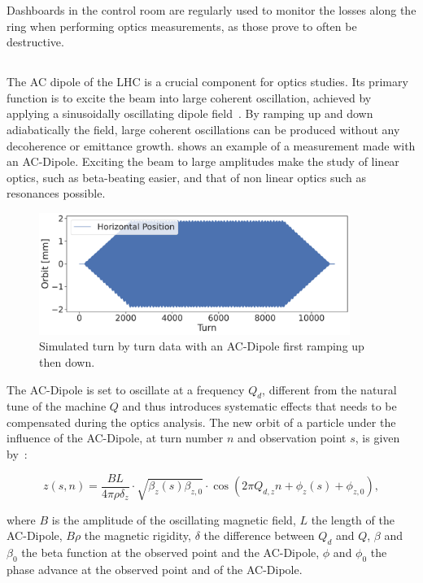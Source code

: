 Dashboards in the control room are regularly used to monitor the losses along the ring when
performing optics measurements, as those prove to often be destructive.

\subsection{}

The AC dipole of the LHC is a crucial component for optics studies. Its primary function is to
excite the beam into large coherent oscillation, achieved by applying a sinusoidally oscillating
dipole field~\cite{miyamoto_parametrization_2008}. By ramping up and down adiabatically the field,
large coherent oscillations can be produced without any decoherence or emittance growth.
 shows an example of a measurement made with an AC-Dipole.  Exciting the beam to
large amplitudes make the study of linear optics, such as beta-beating easier, and that of non
linear optics such as resonances possible.

\begin{figure}
    \center
    \includegraphics[width=0.9\textwidth]{./images/ac_dipole_tbt.pdf}
    \caption{Simulated turn by turn data with an AC-Dipole first ramping up then down.} 
    \label{fig:ac_dipole}
\end{figure}

The AC-Dipole is set to oscillate at a frequency $Q_d$, different from the natural tune of the
machine $Q$ and thus introduces systematic effects that needs to be compensated during the optics
analysis. The new orbit of a particle under the influence of the AC-Dipole, at turn number $n$ and
observation point $s$, is given by~\cite{serrano_lhc_2010}:

\begin{equation}
z(s, n) = \frac{BL}{4\pi\rho\delta_z} \cdot \sqrt{\beta_z(s) \beta_{z,0}} \cdot \cos \left( 2 \pi Q_{d,z}n + \phi_z(s) + \phi_{z,0}\right),
\label{eq:ac_dipole}
\end{equation}

where $B$ is the amplitude of the oscillating magnetic field, $L$ the length of the AC-Dipole,
$B\rho$ the magnetic rigidity, $\delta$ the difference between $Q_d$ and $Q$, $\beta$ and $\beta_0$
the beta function at the observed point and the AC-Dipole, $\phi$ and $\phi_0$ the phase advance at
the observed point and of the AC-Dipole.